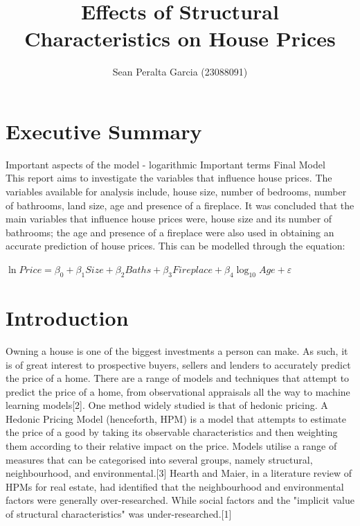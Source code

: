 \documentclass[10pt,A4,makeidx]{article}
\title
{Effects of Structural Characteristics on House Prices}
\author{Sean Peralta Garcia (23088091)}
\date {}
\begin{document}
\maketitle


\section{Executive Summary}
  Important aspects of the model - logarithmic
  Important terms
  Final Model\\
  This report aims to investigate the variables that influence house prices.
  The variables available for analysis include, house size, number of bedrooms,
  number of bathrooms, land size, age and presence of a fireplace. It was concluded that
  the main variables that influence house prices were, house size and its number of bathrooms;
  the age and presence of a fireplace were also used in obtaining an accurate prediction
  of house prices. This can be modelled through the equation:
  
  \begin{center}
    \textbf{    \(\ln Price = \beta _0 + \beta _1 Size + \beta _2 Baths + \beta _3 Fireplace + \beta _4 \log_{10}Age + \varepsilon\)\\}
  \end{center}

\section{Introduction}
  Owning a house is one of the biggest investments a person can make. As such, it 
  is of great interest to prospective buyers, sellers and lenders to accurately
  predict the price of a home. There are a range of models and techniques that 
  attempt to predict the price of a home, from observational appraisals all 
  the way to machine learning models[2]. One method widely studied is that of
  hedonic pricing. A Hedonic Pricing Model (henceforth, HPM) is a model that 
  attempts to estimate the price of a good by taking its observable characteristics
  and then weighting them according to their relative impact on the price. Models
  utilise a range of measures that can be categorised into several groups, 
  namely structural, neighbourhood, and environmental.[3] Hearth and Maier,
  in a literature review of HPMs for real estate, had identified that the 
  neighbourhood and environmental factors were generally over-researched. While
  social factors and the "implicit value of structural characteristics" was 
  under-researched.[1]
\end{document}

